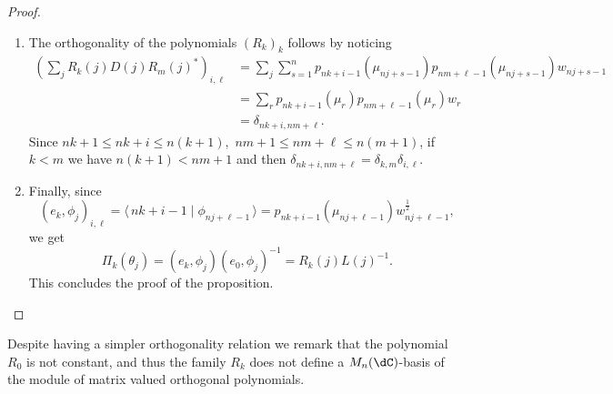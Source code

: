 \documentclass[a4paper,reqno]{amsart}
\theoremstyle{definition}
\numberwithin{equation}{section}
\newcommand{\bra}[1]{\langle\,{#1}}
\newcommand{\ket}[1]{\mid{#1}\,\rangle}
\begin{document}
\begin{proof}
\begin{enumerate}
\begin{equation}
\begin{pmatrix}
1&\ldots&1\\
\mu_0&\ldots&\mu_{nj+n-1}\\
\vdots&\ddots&\vdots\\
\mu^{nj+n-1}_0&\ldots&\mu^{nj+n-1}_{nj+n-1}\end{pmatrix}\begin{pmatrix}
a_0\\
a_1\\
\vdots\\
a_{nj+n-1}
\end{pmatrix}=\begin{pmatrix}
0\\
0\\
\vdots\\
0
\end{pmatrix}\,,
\end{equation}
and we conclude that $a_i=0$ for all $i=0,\ldots, nj+n-1$ since $\mu_j\neq \mu_k$ for $j\neq k$. Thus $V(\theta_0,\ldots,\theta_j)$ is invertible and the Vandermonde condition is satisfied. 
\item The orthogonality of the polynomials $(R_k)_k$ follows by noticing 
\begin{align}
(\sum_jR_k(j)D(j)R_m(j)^\ast)_{i,\ell}&=\sum_j\sum_{s=1}^np_{nk+i-1}(\mu_{nj+s-1})p_{nm+\ell-1}(\mu_{nj+s-1})w_{nj+s-1}\nonumber\\
    &=\sum_rp_{nk+i-1}(\mu_r)p_{nm+\ell-1}(\mu_r)w_r\nonumber\\
    &=\delta_{nk+i,nm+\ell}.
\end{align}
Since $nk+1\leq nk+i\leq n(k+1),$ $nm+1\leq nm+\ell\leq n(m+1)$, if $k<m$ we have $n(k+1)<nm+1$ and then $\delta_{nk+i,nm+\ell}=\delta_{k,m}\delta_{i,\ell}.$ 
\item Finally, since
\begin{equation}
    (e_k,\phi_j)_{i,\ell}=\bra{nk+i-1}\ket{\phi_{nj+\ell-1}}=p_{nk+i-1}(\mu_{nj+\ell-1})w_{nj+\ell-1}^\frac12,
\end{equation}
we get
\begin{equation}
    \Pi_k(\theta_j)=(e_k,\phi_j)(e_0,\phi_j)^{-1}=R_k(j)L(j)^{-1}.
\end{equation}
This concludes the proof of the proposition. 
\end{enumerate}
\end{proof}
Despite having a simpler orthogonality relation we remark that the polynomial $R_0$ is not constant, and thus the family $R_k$ does not define a $M_n(\dC)$-basis of the module of matrix valued orthogonal polynomials. 
\end{document}
